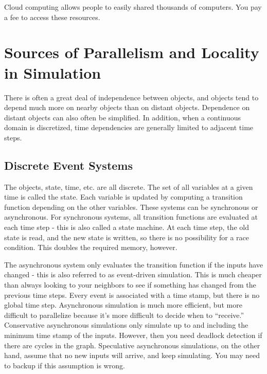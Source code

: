 \documentclass[10pt]{article}
\begin{document}
\begin{flushleft}
Cloud computing allows people to easily shared thousands of computers. You pay a fee to access these resources.

\section{Sources of Parallelism and Locality in Simulation}

There is often a great deal of independence between objects, and objects tend to depend much more on nearby objects than on distant objects. Dependence on distant objects can also often be simplified. In addition, when a continuous domain is discretized, time dependencies are generally limited to adjacent time steps. 

\subsection{Discrete Event Systems}

The objects, state, time, etc. are all discrete. The set of all variables at a given time is called the state. Each variable is updated by computing a transition function depending on the other variables. These systems can be synchronous or asynchronous. For synchronous systems, all transition functions are evaluated at each time step - this is also called a state machine. At each time step, the old state is read, and the new state is written, so there is no possibility for a race condition. This doubles the required memory, however. 

The asynchronous system only evaluates the transition function if the inputs have changed - this is also referred to as event-driven simulation. This is much cheaper than always looking to your neighbors to see if something has changed from the previous time steps. Every event is associated with a time stamp, but there is no global time step. Asynchronous simulation is much more efficient, but more difficult to parallelize because it's more difficult to decide when to ``receive.'' Conservative asynchronous simulations only simulate up to and including the minimum time stamp of the inputs. However, then you need deadlock detection if there are cycles in the graph. Speculative asynchronous simulations, on the other hand, assume that no new inputs will arrive, and keep simulating. You may need to backup if this assumption is wrong. 


\end{flushleft}
\end{document}

